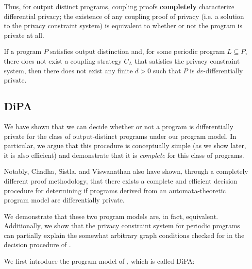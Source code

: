 Thus, for output distinct programs, coupling proofs \textbf{completely} characterize differential privacy; the existence of any coupling proof of privacy (i.e. a solution to the privacy constraint system) is equivalent to whether or not the program is private at all.

\begin{thm}\label{ProgramCounterexampleThm}
    If a program $P$ satisfies output distinction and, for some periodic program $L\subseteq P$, there does not exist a coupling strategy $C_L$ that satisfies the privacy constraint system, then there does not exist any finite $d>0$ such that $P$ is $d\varepsilon$-differentially private.
\end{thm}

\subsection{DiPA}\label{svDiPASection}

We have shown that we can decide whether or not a program is differentially private for the class of output-distinct programs under our program model. In particular, we argue that this procedure is conceptually simple (as we show later, it is also efficient) and demonstrate that it is \textit{complete} for this class of programs.

Notably, Chadha, Sistla, and Viswanathan \cite{chadhaLinearTimeDecidability2021} also have shown, through a completely different proof methodology, that there exists a complete and efficient decision procedure for determining if programs derived from an automata-theoretic program model are differentially private. 

We demonstrate that these two program models are, in fact, equivalent. Additionally, we show that the privacy constraint system for periodic programs can partially explain the somewhat arbitrary graph conditions checked for in the decision procedure of \cite{chadhaLinearTimeDecidability2021}.

We first introduce the program model of \cite{chadhaLinearTimeDecidability2021}, which is called DiPA:

